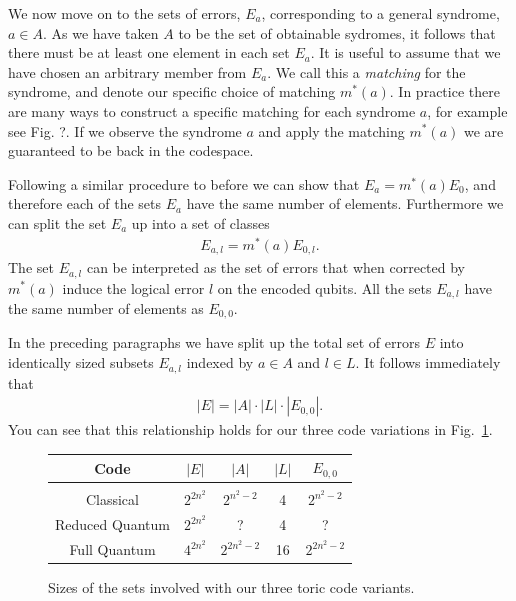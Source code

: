 We now move on to the sets of errors, $E_a$, corresponding to a general syndrome, $a \in A$. As we have taken $A$ to be the set of obtainable sydromes, it follows that there must be at least one element in each set $E_a$. It is useful to assume that we have chosen an arbitrary member from $E_a$. We call this a \textit{matching} for the syndrome, and denote our specific choice of matching $m^*(a)$. In practice there are many ways to construct a specific matching for each syndrome $a$, for example see Fig. ?. If we observe the syndrome $a$ and apply the matching $m^*(a)$ we are guaranteed to be back in the codespace.

Following a similar procedure to before we can show that $E_a = m^*(a) E_0$, and therefore each of the sets $E_a$ have the same number of elements. Furthermore we can split the set $E_a$ up into a set of classes
\begin{align}
  E_{a,l} = m^*(a) E_{0, l}.
\end{align}
The set $E_{a,l}$ can be interpreted as the set of errors that when corrected by $m^*(a)$ induce the logical error $l$ on the encoded qubits. All the sets $E_{a, l}$ have the same number of elements as $E_{0,0}$.

In the preceding paragraphs we have split up the total set of errors $E$ into identically sized subsets $E_{a, l}$ indexed by $a\in A$ and $l\in L$. It follows immediately that
\begin{align}
  |E| = |A| \cdot |L| \cdot |E_{0,0}|.
\end{align}
You can see that this relationship holds for our three code variations in Fig.~\ref{code_sizes}.

\begin{figure}\label{code_sizes}
  \begin{center}
    \begin{tabular}{c c c c c}
      Code & $|E|$ & $|A|$ & $|L|$ & $E_{0,0}$ \\[1.5ex]
      \hline \\[0ex]
      Classical         & $2^{2n^2}$ & $2^{n^2-2}$ &  4 & $2^{n^2-2}$ \\[3ex]
      Reduced Quantum   & $2^{2n^2}$ & ? &  4 &  ?\\[3ex] 
      Full Quantum      & $4^{2n^2}$ & $2^{2n^2-2}$ & 16 & $2^{2n^2-2}$
    \end{tabular}
  \end{center}
  \caption{Sizes of the sets involved with our three toric code variants.}
\end{figure}

